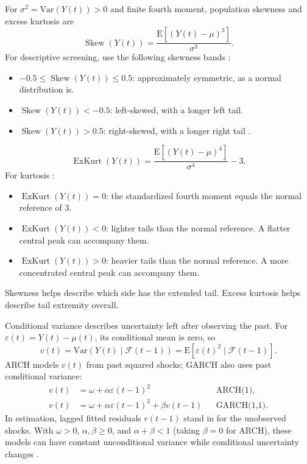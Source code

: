 \documentclass[12pt,a4paper]{article}
\numberwithin{equation}{section}
\numberwithin{table}{section}
\numberwithin{figure}{section}
\begin{document}
For $\sigma^2=\mathrm{Var}(Y(t))>0$ and finite fourth moment, population skewness and excess kurtosis are
\begin{equation}\label{eq:skewness}
\operatorname{Skew}(Y(t))=\frac{\mathrm{E}[(Y(t)-\mu)^3]}{\sigma^3}.
\end{equation}
For descriptive screening, use the following skewness bands \cite{who2019anthro}:
\begin{itemize}
    \item $-0.5\leq\operatorname{Skew}(Y(t))\leq 0.5$: approximately symmetric, as a normal distribution is.
    \item $\operatorname{Skew}(Y(t))<-0.5$: left-skewed, with a longer left tail.
    \item $\operatorname{Skew}(Y(t))>0.5$: right-skewed, with a longer right tail \cite{nistskewkurt}.
\end{itemize}
\begin{equation}\label{eq:excess-kurtosis}
\operatorname{ExKurt}(Y(t))=\frac{\mathrm{E}[(Y(t)-\mu)^4]}{\sigma^4}-3.
\end{equation}
For kurtosis \cite{nistskewkurt}:
\begin{itemize}
    \item $\operatorname{ExKurt}(Y(t))=0$: the standardized fourth moment equals the normal reference of 3.
    \item $\operatorname{ExKurt}(Y(t))<0$: lighter tails than the normal reference. A flatter central peak can accompany them. 
    \item $\operatorname{ExKurt}(Y(t))>0$: heavier tails than the normal reference. A more concentrated central peak can accompany them. 
\end{itemize}

Skewness helps describe which side has the extended tail. Excess kurtosis helps describe tail extremity overall.

Conditional variance describes uncertainty left after observing the past. For $\varepsilon(t)=Y(t)-\mu(t)$, its conditional mean is zero, so
\begin{equation}\label{eq:conditional-variance}
v(t)=\mathrm{Var}(Y(t)\mid\mathcal{F}(t-1))
=\mathrm{E}[\varepsilon(t)^2\mid\mathcal{F}(t-1)].
\end{equation}
ARCH models $v(t)$ from past squared shocks; GARCH also uses past conditional variance:
\begin{equation}\label{eq:arch}
\begin{aligned}
v(t)&=\omega+\alpha\varepsilon(t-1)^2 &&\text{ARCH(1)},\\
v(t)&=\omega+\alpha\varepsilon(t-1)^2+\beta v(t-1) &&\text{GARCH(1,1)}.
\end{aligned}
\end{equation}
In estimation, lagged fitted residuals $r(t-1)$ stand in for the unobserved shocks. With $\omega>0$, $\alpha,\beta\geq0$, and $\alpha+\beta<1$ (taking $\beta=0$ for ARCH), these models can have constant unconditional variance while conditional uncertainty changes \cite{engle1982,bollerslev1986}.
\end{document}

